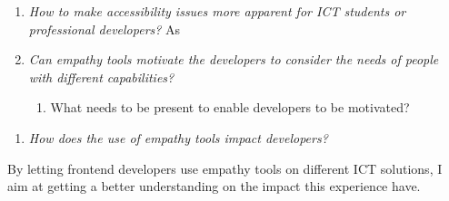 



\begin{enumerate} 
\item \textit{How to make accessibility issues more apparent for ICT students or professional developers?}
As 
\item \textit{Can empathy tools motivate the developers to consider the needs of people with different capabilities?}
    \begin{enumerate}
        \item What needs to be present to enable developers to be motivated?
    \end{enumerate}
\end{enumerate} 

 


\begin{enumerate} 
\item \textit{How does the use of empathy tools impact developers?}

\end{enumerate} 
By letting frontend developers use empathy tools on different ICT solutions, I aim at getting a better understanding on the impact this experience have.


